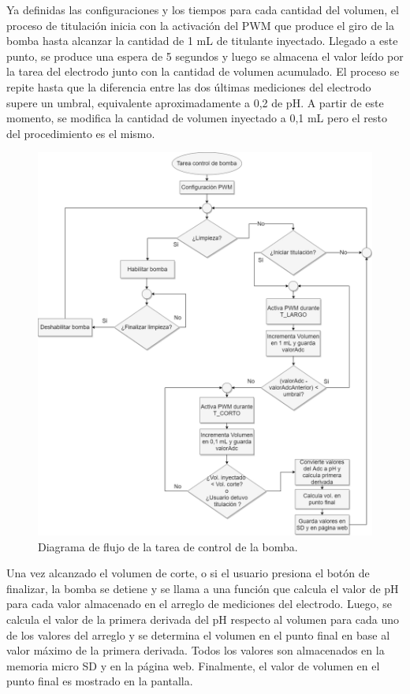 Ya definidas las configuraciones y los tiempos para cada cantidad del volumen, el proceso de titulación inicia con la activación del PWM que produce el giro de la bomba hasta alcanzar la cantidad de 1 mL de titulante inyectado. Llegado a este punto, se produce una espera de 5 segundos y luego se almacena el valor leído por la tarea del electrodo junto con la cantidad de volumen acumulado. El proceso se repite hasta que la diferencia entre las dos últimas mediciones del electrodo supere un umbral, equivalente aproximadamente a 0,2 de pH. A partir de este momento, se modifica la cantidad de volumen inyectado a 0,1 mL pero el resto del procedimiento es el mismo.

\begin{figure}[htbp]
	\centering
	\includegraphics[width=1.0\textwidth]{./Figures/motorBomba.png}
	\caption{Diagrama de flujo de la tarea de control de la bomba.}
	\label{fig:flujoBomba}
\end{figure}

Una vez alcanzado el volumen de corte, o si el usuario presiona el botón de finalizar, la bomba se detiene y se llama a una función que calcula el valor de pH para cada valor almacenado en el arreglo de mediciones del electrodo. Luego, se calcula el valor de la primera derivada del pH respecto al volumen para cada uno de los valores del arreglo y se determina el volumen en el punto final en base al valor máximo de la primera derivada. Todos los valores son almacenados en la memoria micro SD y en la página web. Finalmente, el valor de volumen en el punto final es mostrado en la pantalla.


